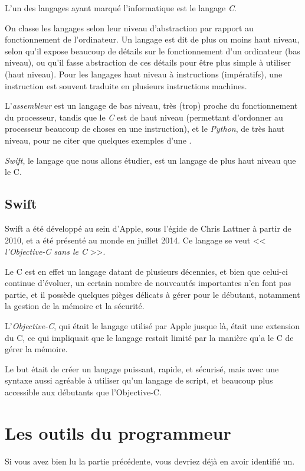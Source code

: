 L'un des langages ayant marqué l'informatique est le langage \emph{C}.

On classe les langages selon leur niveau d'abstraction
par rapport au fonctionnement de l'ordinateur.
Un langage est dit de plus ou moins haut niveau,
selon qu'il expose beaucoup de détails sur le fonctionnement d'un ordinateur (bas niveau),
ou qu'il fasse abstraction de ces détails pour être plus simple à utiliser (haut niveau).
Pour les langages haut niveau à instructions (impératifs),
une instruction est souvent traduite en plusieurs instructions machines.


L'\emph{assembleur} est un langage de bas niveau,
très (trop) proche du fonctionnement du processeur,
tandis que le \emph{C} est de haut niveau
(permettant d'ordonner au processeur beaucoup de choses en une instruction),
et le \emph{Python}, de très haut niveau,
pour ne citer que quelques exemples d'une 
.

\emph{Swift}, le langage que nous allons étudier, est un langage de plus haut niveau
que le C.
\subsection{Swift}
Swift a été développé au sein d'Apple, sous l'égide de Chris Lattner à partir de 2010, et a
été présenté au monde en juillet 2014. Ce langage se veut << \emph{l'Objective-C sans le C} >>.

Le C est en effet un langage datant de plusieurs décennies,
et bien que celui-ci continue d'évoluer,
un certain nombre de nouveautés importantes n'en font pas partie,
et il possède quelques pièges délicats à gérer pour le débutant,
notamment la gestion de la mémoire et la sécurité.

L'\emph{Objective-C}, qui était le langage utilisé par Apple jusque là,
était une extension du C, ce qui impliquait que le langage restait limité
par la manière qu'a le C de gérer la mémoire.

Le but était de créer un langage puissant, rapide, et sécurisé, mais avec une syntaxe
aussi agréable à utiliser qu’un langage de script,
et beaucoup plus accessible aux débutants que l'Objective-C.
\section{Les outils du programmeur}
Si vous avez bien lu la partie précédente, vous devriez déjà en avoir identifié un.

